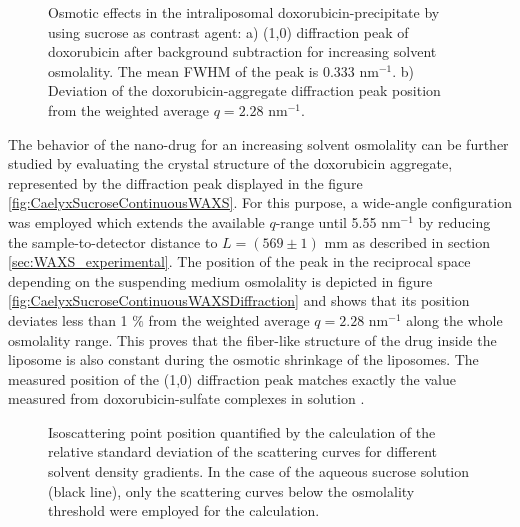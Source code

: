 \begin{figure}
	\centering
		\caption[Osmotic effects in the intraliposomal doxorubicin-precipitate]{Osmotic effects in the intraliposomal doxorubicin-precipitate by using sucrose as contrast agent: a) (1,0) diffraction peak of doxorubicin after background subtraction for increasing solvent osmolality. The mean FWHM of the peak is 0.333  nm$^{-1}$. b) Deviation of the doxorubicin-aggregate diffraction peak position from the weighted average $q=2.28$ nm$^{-1}$.}
\end{figure}

The behavior of the nano-drug for an increasing solvent osmolality can be further studied by evaluating the crystal structure of the doxorubicin aggregate, represented by the diffraction peak displayed in the figure \ref{fig:CaelyxSucroseContinuousWAXS}. For this purpose, a wide-angle configuration was employed which extends the available $q$-range until 5.55 nm$^{-1}$ by reducing the sample-to-detector distance to $L = (569 \pm  1)$ mm as described in section \ref{sec:WAXS_experimental}. The position of the peak in the reciprocal space depending on the suspending medium osmolality is depicted in figure \ref{fig:CaelyxSucroseContinuousWAXSDiffraction} and shows that its position deviates less than 1 $\%$ from the weighted average $q=2.28$ nm$^{-1}$ along the whole osmolality range. This proves that the fiber-like structure of the drug inside the liposome is also constant during the osmotic shrinkage of the liposomes. The measured position of the (1,0) diffraction peak matches exactly the value measured from doxorubicin-sulfate complexes in solution \citep{lasic_gelation_1992}. 

\begin{figure}
	\centering
		
		\caption[Isoscattering point position of Caelyx with different solvents.]{Isoscattering point position quantified by the calculation of the relative standard deviation of the scattering curves for different solvent density gradients. In the case of the aqueous sucrose solution (black line), only the scattering curves below the osmolality threshold were employed for the calculation.}
		\label{fig:CaelyxIsopointComparison}
\end{figure}

